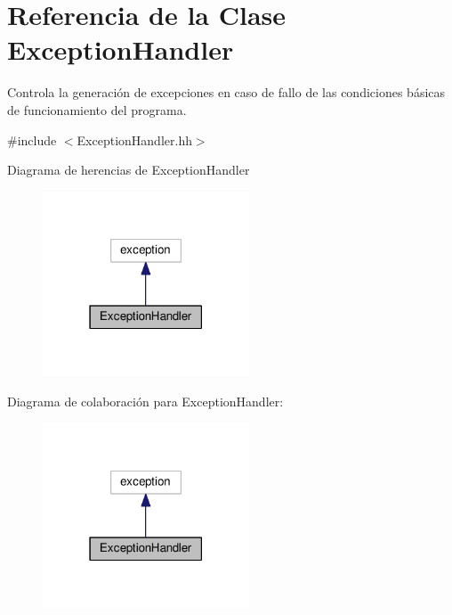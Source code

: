 \hypertarget{class_exception_handler}{}\section{Referencia de la Clase Exception\+Handler}
\label{class_exception_handler}


Controla la generación de excepciones en caso de fallo de las condiciones básicas de funcionamiento del programa.  




{\ttfamily \#include $<$Exception\+Handler.\+hh$>$}



Diagrama de herencias de Exception\+Handler\nopagebreak
\begin{figure}[H]
\begin{center}
\leavevmode
\includegraphics[width=174pt]{class_exception_handler__inherit__graph}
\end{center}
\end{figure}


Diagrama de colaboración para Exception\+Handler\+:\nopagebreak
\begin{figure}[H]
\begin{center}
\leavevmode
\includegraphics[width=174pt]{class_exception_handler__coll__graph}
\end{center}
\end{figure}
